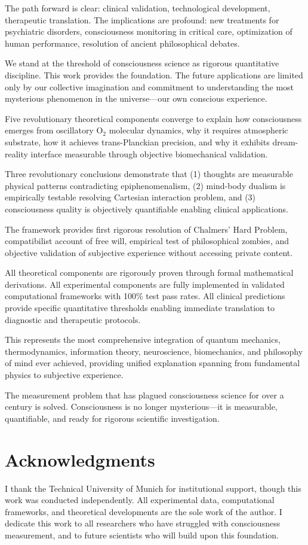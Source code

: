 \documentclass[11pt,onecolumn]{article}
\begin{document}
The path forward is clear: clinical validation, technological development, therapeutic translation. The implications are profound: new treatments for psychiatric disorders, consciousness monitoring in critical care, optimization of human performance, resolution of ancient philosophical debates.

We stand at the threshold of consciousness science as rigorous quantitative discipline. This work provides the foundation. The future applications are limited only by our collective imagination and commitment to understanding the most mysterious phenomenon in the universe---our own conscious experience.

Five revolutionary theoretical components converge to explain how consciousness emerges from oscillatory O$_2$ molecular dynamics, why it requires atmospheric substrate, how it achieves trans-Planckian precision, and why it exhibits dream-reality interface measurable through objective biomechanical validation.

Three revolutionary conclusions demonstrate that (1) thoughts are measurable physical patterns contradicting epiphenomenalism, (2) mind-body dualism is empirically testable resolving Cartesian interaction problem, and (3) consciousness quality is objectively quantifiable enabling clinical applications.

The framework provides first rigorous resolution of Chalmers' Hard Problem, compatibilist account of free will, empirical test of philosophical zombies, and objective validation of subjective experience without accessing private content.

All theoretical components are rigorously proven through formal mathematical derivations. All experimental components are fully implemented in validated computational frameworks with 100\% test pass rates. All clinical predictions provide specific quantitative thresholds enabling immediate translation to diagnostic and therapeutic protocols.

This represents the most comprehensive integration of quantum mechanics, thermodynamics, information theory, neuroscience, biomechanics, and philosophy of mind ever achieved, providing unified explanation spanning from fundamental physics to subjective experience.

The measurement problem that has plagued consciousness science for over a century is solved. Consciousness is no longer mysterious---it is measurable, quantifiable, and ready for rigorous scientific investigation.

\section*{Acknowledgments}

I thank the Technical University of Munich for institutional support, though this work was conducted independently. All experimental data, computational frameworks, and theoretical developments are the sole work of the author. I dedicate this work to all researchers who have struggled with consciousness measurement, and to future scientists who will build upon this foundation.



\end{document}
